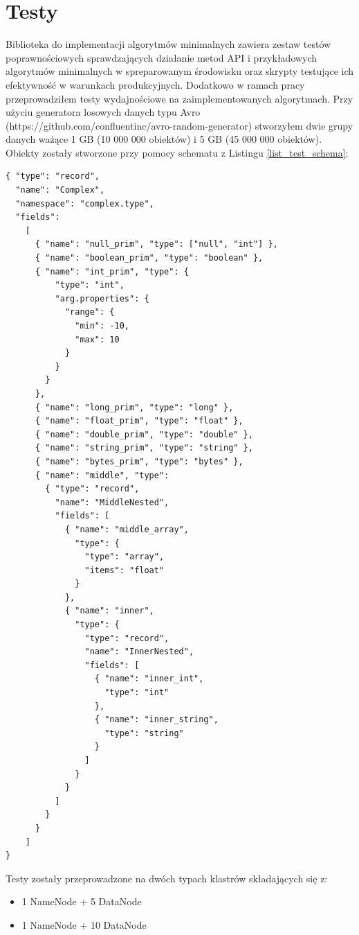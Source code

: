 \documentclass[magisterska]{pracamgr}
\begin{document}
\chapter{Testy}

Biblioteka do implementacji algorytmów minimalnych zawiera zestaw testów poprawnościowych sprawdzających działanie metod API i przykładowych algorytmów minimalnych w spreparowanym środowisku oraz skrypty testujące ich efektywność w warunkach produkcyjnych. Dodatkowo w ramach pracy przeprowadziłem testy wydajnościowe na zaimplementowanych algorytmach. Przy użyciu generatora losowych danych typu Avro (https://github.com/confluentinc/avro-random-generator) stworzyłem dwie grupy danych ważące 1 GB (10 000 000 obiektów) i 5 GB (45 000 000 obiektów). Obiekty zostały stworzone przy pomocy  schematu z Listingu \ref{list_test_schema}:

\begin{lstlisting}[language=SmallJava,firstnumber=1,label=list_test_schema,caption=Schemat obiektów użytych podczas testowania]
{ "type": "record",
  "name": "Complex",
  "namespace": "complex.type",
  "fields":
    [
      { "name": "null_prim", "type": ["null", "int"] },
      { "name": "boolean_prim", "type": "boolean" },
      { "name": "int_prim", "type": {
          "type": "int",
          "arg.properties": {
            "range": {
              "min": -10,
              "max": 10
            }
          }
        }
      },
      { "name": "long_prim", "type": "long" },
      { "name": "float_prim", "type": "float" },
      { "name": "double_prim", "type": "double" },
      { "name": "string_prim", "type": "string" },
      { "name": "bytes_prim", "type": "bytes" },
      { "name": "middle", "type":
        { "type": "record",
          "name": "MiddleNested",
          "fields": [
            { "name": "middle_array",
              "type": {
                "type": "array",
                "items": "float"
              }
            },
            { "name": "inner",
              "type": {
                "type": "record",
                "name": "InnerNested",
                "fields": [
                  { "name": "inner_int",
                    "type": "int"
                  },
                  { "name": "inner_string",
                    "type": "string"
                  }
                ]
              }
            }
          ]
        }
      }
    ]
}
\end{lstlisting}

Testy zostały przeprowadzone na dwóch typach klastrów składających się z:
\begin{itemize}
    \item 1 NameNode + 5 DataNode
    \item 1 NameNode + 10 DataNode
\end{itemize}
\end{document}
